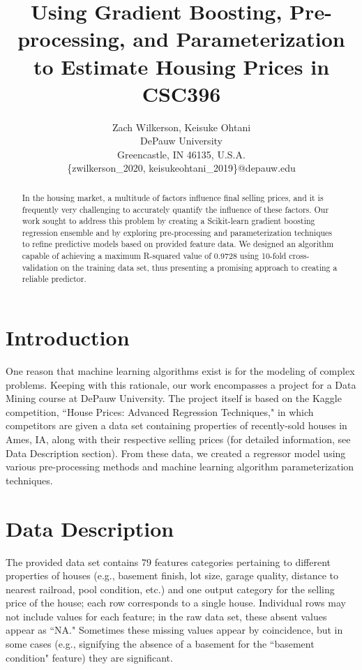 \documentclass[letterpaper]{article}
\begin{document}
\title{Using Gradient Boosting, Pre-processing, and Parameterization to Estimate Housing Prices in CSC396}
\author{Zach Wilkerson, Keisuke Ohtani\\
DePauw University\\
Greencastle, IN 46135, U.S.A.\\
\{zwilkerson\_2020, keisukeohtani\_2019\}@depauw.edu\\
}
\maketitle
\begin{abstract}
In the housing market, a multitude of factors influence final selling prices, and it is frequently very challenging to accurately quantify the influence of these factors.  Our work sought to address this problem by creating a Scikit-learn gradient boosting regression ensemble and by exploring pre-processing and parameterization techniques to refine predictive models based on provided feature data.  We designed an algorithm capable of achieving a maximum R-squared value of 0.9728 using 10-fold cross-validation on the training data set, thus presenting a promising approach to creating a reliable predictor.
\end{abstract} 

\section{Introduction}

One reason that machine learning algorithms exist is for the modeling of complex problems.  Keeping with this rationale, our work encompasses a project for a Data Mining course at DePauw University.  The project itself is based on the Kaggle competition, ``House Prices: Advanced Regression Techniques," in which competitors are given a data set containing properties of recently-sold houses in Ames, IA, along with their respective selling prices (for detailed information, see Data Description section).  From these data, we created a regressor model using various pre-processing methods and machine learning algorithm parameterization techniques.

\section{Data Description}

The provided data set contains 79 features categories pertaining to different properties of houses (e.g., basement finish, lot size, garage quality, distance to nearest railroad, pool condition, etc.) and one output category for the selling price of the house; each row corresponds to a single house.  Individual rows may not include values for each feature; in the raw data set, these absent values appear as ``NA."  Sometimes these missing values appear by coincidence, but in some cases (e.g., signifying the absence of a basement for the ``basement condition" feature) they are significant.
\end{document}

